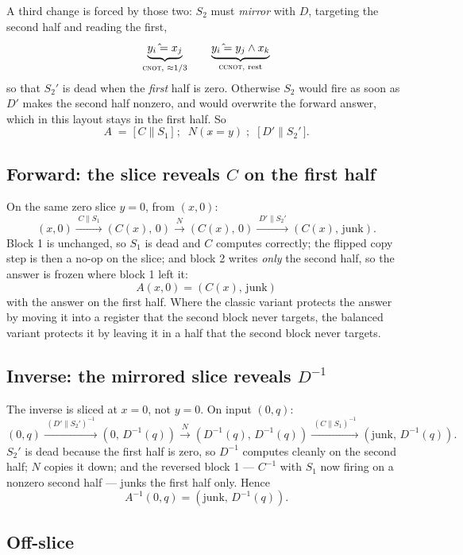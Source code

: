 \documentclass[11pt]{article}
\newcommand{\CNOT}{\textsc{cnot}}
\newcommand{\CCNOT}{\textsc{ccnot}}
\begin{document}
\noindent A third change is forced by those two: $S_2$ must \emph{mirror} with
$D$, targeting the second half and reading the first,
\[
\underbrace{y_i \mathrel{\hat{}}= x_j}_{\text{\CNOT, }\approx 1/3}
\qquad
\underbrace{y_i \mathrel{\hat{}}= y_j \wedge x_k}_{\text{\CCNOT, rest}}
\]
so that $S_2'$ is dead when the \emph{first} half is zero. Otherwise $S_2$
would fire as soon as $D'$ makes the second half nonzero, and would overwrite
the forward answer, which in this layout stays in the first half. So
\[
A \;=\; \bigl[\, C \parallel S_1 \,\bigr]\;;\;\; N(x \mathrel{\hat{}}= y) \;;\;\;
        \bigl[\, D' \parallel S_2' \,\bigr].
\]

\subsection{Forward: the slice reveals $C$ on the first half}

On the same zero slice $y=0$, from $(x,0)$:
\[
(x,0)
\xrightarrow{\;C \parallel S_1\;} (C(x),\,0)
\xrightarrow{\;N\;} (C(x),\,0)
\xrightarrow{\;D' \parallel S_2'\;} (C(x),\,\text{junk}).
\]
Block 1 is unchanged, so $S_1$ is dead and $C$ computes correctly; the flipped
copy step is then a no-op on the slice; and block 2 writes \emph{only} the
second half, so the answer is frozen where block 1 left it:
\[
\boxed{\,A(x,0) = (C(x),\,\text{junk})\,}
\]
with the answer on the first half. Where the classic variant protects the
answer by moving it into a register that the second block never targets, the
balanced variant protects it by leaving it in a half that the second block
never targets.

\subsection{Inverse: the mirrored slice reveals $D^{-1}$}

The inverse is sliced at $x=0$, not $y=0$. On input $(0,q)$:
\[
(0,q)
\xrightarrow{\;(D' \parallel S_2')^{-1}\;} (0,\,D^{-1}(q))
\xrightarrow{\;N\;} (D^{-1}(q),\,D^{-1}(q))
\xrightarrow{\;(C \parallel S_1)^{-1}\;} (\text{junk},\,D^{-1}(q)).
\]
$S_2'$ is dead because the first half is zero, so $D^{-1}$ computes cleanly on
the second half; $N$ copies it down; and the reversed block 1 --- $C^{-1}$ with
$S_1$ now firing on a nonzero second half --- junks the first half only. Hence
\[
\boxed{\,A^{-1}(0,q) = (\text{junk},\, D^{-1}(q)).\,}
\]

\subsection{Off-slice}
\end{document}

